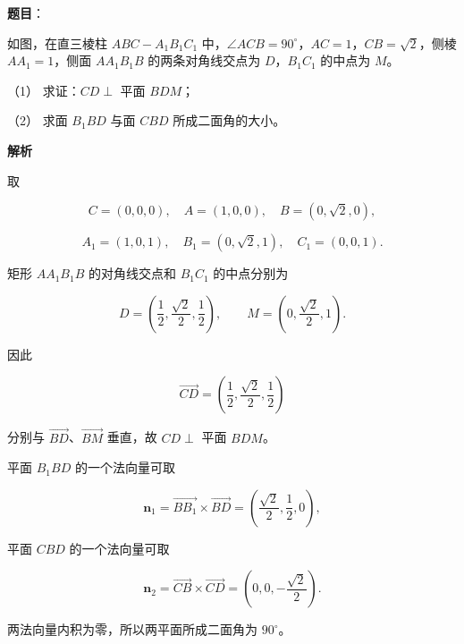 \begin{answer}

\textbf{题目}：

如图，在直三棱柱 $ABC-A_1B_1C_1$ 中，$\angle ACB=90^\circ$，$AC=1$，$CB=\sqrt2$，侧棱 $AA_1=1$，侧面 $AA_1B_1B$ 的两条对角线交点为 $D$，$B_1C_1$ 的中点为 $M$。
\nopagebreak[4]
\begin{center}\end{center}
\nopagebreak[4]
（1） 求证：$CD\perp$ 平面 $BDM$；

（2） 求面 $B_1BD$ 与面 $CBD$ 所成二面角的大小。

\textbf{解析}


取

\nopagebreak[4]
\[
C=(0,0,0),\quad A=(1,0,0),\quad B=(0,\sqrt2,0),
\]

\nopagebreak[4]
\[
A_1=(1,0,1),\quad B_1=(0,\sqrt2,1),\quad C_1=(0,0,1).
\]

矩形 $AA_1B_1B$ 的对角线交点和 $B_1C_1$ 的中点分别为

\nopagebreak[4]
\[
D=\left(\frac12,\frac{\sqrt2}{2},\frac12\right),\qquad
M=\left(0,\frac{\sqrt2}{2},1\right).
\]

因此

\nopagebreak[4]
\[
\overrightarrow{CD}=\left(\frac12,\frac{\sqrt2}{2},\frac12\right)
\]

分别与 $\overrightarrow{BD}$、$\overrightarrow{BM}$ 垂直，故 $CD\perp$ 平面 $BDM$。


平面 $B_1BD$ 的一个法向量可取

\nopagebreak[4]
\[
\boldsymbol n_1=\overrightarrow{BB_1}\times\overrightarrow{BD}
=\left(\frac{\sqrt2}{2},\frac12,0\right),
\]

平面 $CBD$ 的一个法向量可取

\nopagebreak[4]
\[
\boldsymbol n_2=\overrightarrow{CB}\times\overrightarrow{CD}
=\left(0,0,-\frac{\sqrt2}{2}\right).
\]

两法向量内积为零，所以两平面所成二面角为 $90^\circ$。



\end{answer}
